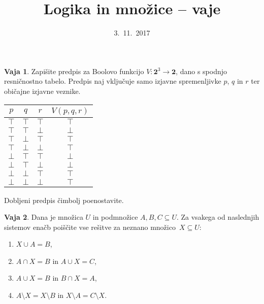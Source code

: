 \documentclass{article}
\newcommand{\lthen}{\Rightarrow}
\newcommand{\two}{\mathbf{2}}
\newcommand{\true}{\top}
\newcommand{\false}{\bot}
\theoremstyle{definition}
\newtheorem{vaja}{Vaja}
\begin{document}
\title{Logika in množice -- vaje}
\date{3.~11.~2017}
\maketitle

\begin{vaja}
  Zapišite predpis za Boolovo funkcijo $V\colon \two^3 \to \two$, dano s spodnjo
  res\-ni\-čno\-stno tabelo. Predpis naj vključuje samo izjavne spremenljivke $p$, $q$ in
  $r$ ter običajne izjavne veznike.
  \smallskip
  \begin{center}
    \begin{tabular}{ccc|c}
      $p$ & $q$ & $r$ & $V(p, q, r)$ \\
      \hline
      $\true$ & $\true$ & $\true$ & $\true$  \\
      $\true$ & $\true$ & $\false$ & $\false$  \\
      $\true$ & $\false$ & $\true$ & $\true$  \\
      $\true$ & $\false$ & $\false$ & $\true$  \\
      $\false$ & $\true$ & $\true$ & $\false$  \\
      $\false$ & $\true$ & $\false$ & $\false$  \\
      $\false$ & $\false$ & $\true$ & $\true$  \\
      $\false$ & $\false$ & $\false$ & $\true$  \\
    \end{tabular}
  \end{center}
  \smallskip
  Dobljeni predpis čimbolj poenostavite.
\end{vaja}

\begin{vaja}
  Dana je množica $U$ in podmnožice $A, B, C \subseteq U$. Za vsakega od naslednjih
  sistemov enačb poiščite vse rešitve za neznano množico~$X \subseteq U$:
  \begin{enumerate}
  \item $X \cup A = B$,
  \item $A \cap X = B$ in $A \cup X = C$,
  \item $A \cup X = B$ in $B \cap X = A$,
  \item $A \setminus X = X \setminus B$ in $X \setminus A = C \setminus X$.
  \end{enumerate}
\end{vaja}
\end{document}
